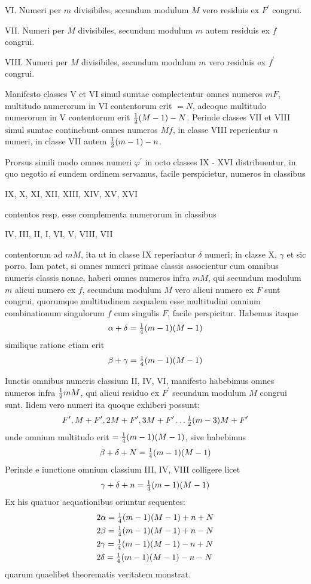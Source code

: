 \documentclass[twoside,12pt, showframe]{memoir}
\let\oldfrac\frac
\def\frac#1#2{\mathchoice{\tfrac{#1}{#2}}{\oldfrac{#1}{#2}}{\genfrac{}{}{}{2}{#1}{#2\mathstrut}}{\genfrac{}{}{}{3}{#1}{#2\mathstrut}}}
\begin{document}
VI. Numeri per \(m\) divisibiles, secundum modulum \(M\) vero residuis ex \(F^{\prime}\) congrui.
 
VII. Numeri per \(M\) divisibiles, secundum modulum \(m\) autem residuis ex \(f\) congrui.
 
VIII. Numeri per \(M\) divisibiles, secundum modulum \(m\) vero residuis ex \(f^{\prime}\) congrui.
 
Manifesto classes V et VI simul sumtae complectentur omnes numeros \(m F\), multitudo numerorum in VI contentorum erit \(=N\), adeoque multitudo numerorum in V contentorum erit \(\frac{1}{2}(M-1)-N\). Perinde classes VII et VIII simul sumtae continebunt omnes numeros \(M f\), in classe VIII reperientur \(n\) numeri, in classe VII autem \(\frac{1}{2}(m-1)-n\).

Prorsus simili modo omnes numeri \(\varphi^{\prime}\) in octo classes IX - XVI distribuentur, in quo negotio si eundem ordinem servamus, facile perspicietur, numeros in classibus
\begin{center} IX, X, XI, XII, XIII, XIV, XV, XVI \end{center}
contentos resp. esse complementa numerorum in classibus
\begin{center} IV, III, II, I, VI, V, VIII, VII \end{center}
contentorum ad \(m M\), ita ut in classe IX reperiantur \(\delta\) numeri; in classe X, \(\gamma\) et sic porro. Iam patet, si omnes numeri primae classis associentur cum omnibus numeris classis nonae, haberi omnes numeros infra \(m M\), qui secundum modulum \(m\) alicui numero ex \(f\), secundum modulum \(M\) vero alicui numero ex \(F\) sunt congrui, quorumque multitudinem aequalem esse multitudini omnium combinationum singulorum \(f\) cum singulis \(F\), facile perspicitur. Habemus itaque
\[\alpha+\delta=\frac{1}{4}(m-1)(M-1)\]\clearpage\noindent%
similique ratione etiam erit
\[\beta+\gamma=\frac{1}{4}(m-1)(M-1)\]

Iunctis omnibus numeris classium II, IV, VI, manifesto habebimus omnes numeros infra \(\frac{1}{2} m M\), qui alicui residuo ex \(F^{\prime}\) secundum modulum \(M\) congrui sunt. Iidem vero numeri ita quoque exhiberi possunt:
\[F^{\prime}, M+F^{\prime}, 2 M+F^{\prime}, 3 M+F^{\prime} \ldots \frac{1}{2}(m-3) M+F^{\prime}\]
unde omnium multitudo erit \(=\frac{1}{4}(m-1)(M-1)\), sive habebimus
\[\beta+\delta+N=\frac{1}{4}(m-1)(M-1)\]
Perinde e iunctione omnium classium III, IV, VIII colligere licet
\[\gamma+\delta+n=\frac{1}{4}(m-1)(M-1)\]
Ex his quatuor aequationibus oriuntur sequentes:
\[\begin{aligned}
& 2 \alpha=\frac{1}{4}(m-1)(M-1)+n+N \\
& 2 \beta=\frac{1}{4}(m-1)(M-1)+n-N \\
& 2 \gamma=\frac{1}{4}(m-1)(M-1)-n+N \\
& 2 \delta=\frac{1}{4}(m-1)(M-1)-n-N
\end{aligned}\]
quarum quaelibet theorematis veritatem monstrat.
\end{document}
